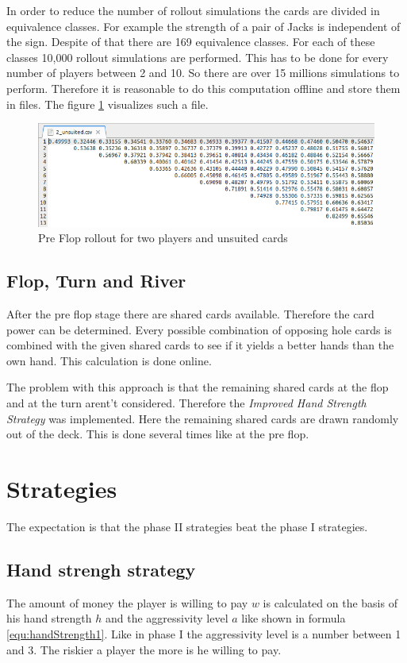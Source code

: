 In order to reduce the number of rollout simulations the cards are divided in equivalence classes. For example the strength of a pair of Jacks is independent of the sign. Despite of that there are 169 equivalence classes. For each of these classes 10,000 rollout simulations are performed. This has to be done for every number of players between 2 and 10. So there are over 15 millions simulations to perform. Therefore it is reasonable to do this computation offline and store them in files. The figure \ref{fig:preflop} visualizes such a file.

\begin{figure}[h]
  \centering
  \includegraphics[width=1.0\textwidth]{images/preflop}
  \caption{Pre Flop rollout for two players and unsuited cards}
  \label{fig:preflop}
\end{figure}

\subsection{Flop, Turn and River}
After the pre flop stage there are shared cards available. Therefore the card power can be determined. Every possible combination of opposing hole cards is combined with the given shared cards to see if it yields a better hands than the own hand. This calculation is done online.

The problem with this approach is that the remaining shared cards at the flop and at the turn arent't considered. Therefore the \emph{Improved Hand Strength Strategy} was implemented. Here the remaining shared cards are drawn randomly out of the deck. This is done several times like at the pre flop.

\section{Strategies}
The expectation is that the phase II strategies beat the phase I strategies.

\subsection{Hand strengh strategy}
The amount of money the player is willing to pay $w$ is calculated on the basis of his hand strength $h$ and the aggressivity level $a$ like shown in formula \ref{equ:handStrength1}. Like in phase I the aggressivity level is a number between 1 and 3. The riskier a player the more is he willing to pay. 

